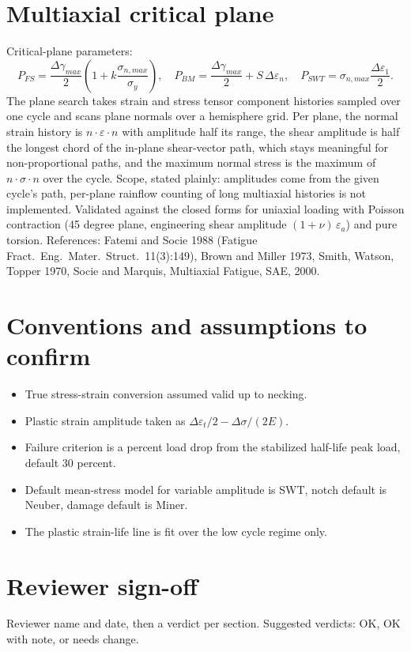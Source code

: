 \documentclass[11pt]{article}
\begin{document}
\section{Multiaxial critical plane}
Critical-plane parameters:
\begin{equation}
P_{FS} = \frac{\Delta\gamma_{max}}{2}\left(1 + k\frac{\sigma_{n,max}}{\sigma_y}\right),
\quad
P_{BM} = \frac{\Delta\gamma_{max}}{2} + S\,\Delta\varepsilon_n,
\quad
P_{SWT} = \sigma_{n,max}\frac{\Delta\varepsilon_1}{2}.
\end{equation}
The plane search takes strain and stress tensor component histories sampled
over one cycle and scans plane normals over a hemisphere grid. Per plane,
the normal strain history is \(n\cdot\varepsilon\cdot n\) with amplitude
half its range, the shear amplitude is half the longest chord of the
in-plane shear-vector path, which stays meaningful for non-proportional
paths, and the maximum normal stress is the maximum of
\(n\cdot\sigma\cdot n\) over the cycle. Scope, stated plainly: amplitudes
come from the given cycle's path, per-plane rainflow counting of long
multiaxial histories is not implemented. Validated against the closed forms
for uniaxial loading with Poisson contraction (45 degree plane, engineering
shear amplitude \((1+\nu)\,\varepsilon_a\)) and pure torsion.
References: Fatemi and Socie 1988 (Fatigue Fract.\ Eng.\ Mater.\ Struct.\
11(3):149), Brown and Miller 1973, Smith, Watson, Topper 1970, Socie and
Marquis, Multiaxial Fatigue, SAE, 2000.

\section{Conventions and assumptions to confirm}
\begin{itemize}[nosep]
\item True stress-strain conversion assumed valid up to necking.
\item Plastic strain amplitude taken as \(\Delta\varepsilon_t/2 - \Delta\sigma/(2E)\).
\item Failure criterion is a percent load drop from the stabilized half-life peak load, default 30 percent.
\item Default mean-stress model for variable amplitude is SWT, notch default is Neuber, damage default is Miner.
\item The plastic strain-life line is fit over the low cycle regime only.
\end{itemize}

\section{Reviewer sign-off}
Reviewer name and date, then a verdict per section. Suggested verdicts: OK, OK
with note, or needs change.
\end{document}
